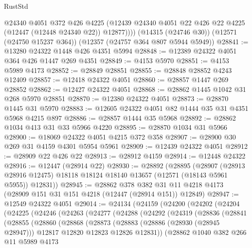 \begin{lexlean}{RustStd}
\begin{coremodule}
          @24340
          @4051
          @372
          @426
          @4225
          (@12439 @24340 @4051 @22 @426 @22 @4225 (@12447 (@12448 @24340 @22)) @12877))))
    (@14315 (@24746 @30))
    (@12571 (@24750 @15237 @364))
    (@12357 (@24757 @364 @807 @5944 @5949))
@28841 := @13280 @24322 @1448 @426 @4351 @5994
@28848 := @12389 @24322 @4051 @364 @426 @1447 @269 @4351
@28849 := @4153 @5970
@28851 := @4153 @5989 @4173
@28852 := @28849 @28851
@28855 := @28848 @28852 @4243 @12409
@28857 := @12418 @24322 @4051
@28860 := @28857 @1447 @269 @28852
@28862 := @12427 @24322 @4051
@28868 := @28862 @1445 @1042 @31 @268 @5970 @28851
@28870 := @12380 @24322 @4051
@28873 := @28870 @1445 @31 @5970
@28883 := @12605 @24322 @4051 @82 @1444 @35 @31 @4351 @5968 @4215 @897
@28886 := @28857 @1444 @35 @5968
@28892 := @28862 @1034 @413 @31 @33 @5966 @4220
@28895 := @28870 @1034 @31 @5966
@28900 := @18069 @24322 @4051 @4215 @372 @358
@28907 := @28900 @30 @269 @31 @4159 @4301 @5954 @5961
@28909 := @12439 @24322 @4051
@28912 := @28909 @22 @426 @22
@28913 := @28912 @4159
@28914 := @12448 @24322
@28916 := @12447 (@28914 @22)
@28930 := @28892
    (@28895
      (@28907
        (@28913 @28916 @12475)
        @18118
        @18124
        @18140
        @13657
        (@12571 (@18143 @5961 @5955))
        @12831))
@28945 := @28862
    @378
    @382
    @31
    @11
    @4218
    @4173
    (@28909 @151 @31 @151 @4218 (@12447 (@28914 @151)) @12849)
@28947 := @12549 @24322 @4051
@29014 := @24134
    (@24159
      (@24200
        (@24202
          (@24204
            (@24225
              (@24246
                (@24263
                  (@24277
                    (@24288
                      (@24292
                        (@24319
                          (@28836
                            (@28841
                              (@28855
                                (@28860
                                  (@28868
                                    (@28873
                                      (@28883
                                        (@28886 (@28930 (@28945 @28947)))
                                        @12817
                                        @12820
                                        @12823
                                        @12826
                                        @12831))
                                    (@28862
                                      @1040
                                      @382
                                      @266
                                      @11
                                      @5989
                                      @4173

\end{coremodule}
\end{lexlean}
